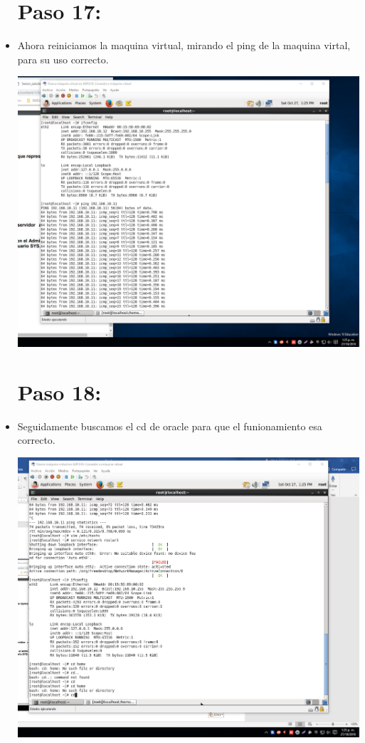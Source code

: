 \documentclass{article}
\begin{document}
\begin{itemize}
\section{Paso 17:} 
	\item Ahora reiniciamos la maquina virtual, mirando el ping de la maquina virtal, para su uso correcto.
	\begin{center}
	\includegraphics[width=14cm]{./Imagenes/imagen17} 
	\end{center}
\section{Paso 18:} 
	\item Seguidamente buscamos el cd de oracle para que el funionamiento esa correcto.
	\begin{center}
	\includegraphics[width=14cm]{./Imagenes/imagen18} 
	\end{center}
\newpage

\end{itemize}
\end{document}
